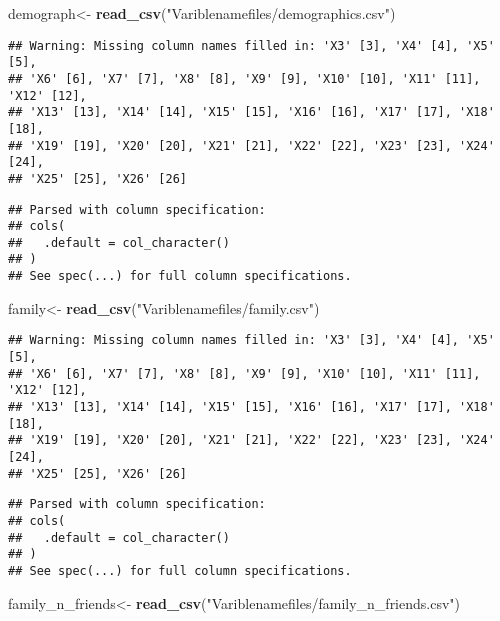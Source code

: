 \documentclass[]{article}
\newenvironment{Shaded}{\begin{snugshade}}{\end{snugshade}}
\newcommand{\KeywordTok}[1]{\textcolor[rgb]{0.13,0.29,0.53}{\textbf{#1}}}
\newcommand{\StringTok}[1]{\textcolor[rgb]{0.31,0.60,0.02}{#1}}
\newcommand{\NormalTok}[1]{#1}
\begin{document}
\begin{Shaded}
\begin{Highlighting}[]
\NormalTok{demograph<-}\StringTok{ }\KeywordTok{read_csv}\NormalTok{(}\StringTok{"Variblenamefiles/demographics.csv"}\NormalTok{)}
\end{Highlighting}
\end{Shaded}

\begin{verbatim}
## Warning: Missing column names filled in: 'X3' [3], 'X4' [4], 'X5' [5],
## 'X6' [6], 'X7' [7], 'X8' [8], 'X9' [9], 'X10' [10], 'X11' [11], 'X12' [12],
## 'X13' [13], 'X14' [14], 'X15' [15], 'X16' [16], 'X17' [17], 'X18' [18],
## 'X19' [19], 'X20' [20], 'X21' [21], 'X22' [22], 'X23' [23], 'X24' [24],
## 'X25' [25], 'X26' [26]
\end{verbatim}

\begin{verbatim}
## Parsed with column specification:
## cols(
##   .default = col_character()
## )
## See spec(...) for full column specifications.
\end{verbatim}

\begin{Shaded}
\begin{Highlighting}[]
\NormalTok{family<-}\StringTok{ }\KeywordTok{read_csv}\NormalTok{(}\StringTok{"Variblenamefiles/family.csv"}\NormalTok{)}
\end{Highlighting}
\end{Shaded}

\begin{verbatim}
## Warning: Missing column names filled in: 'X3' [3], 'X4' [4], 'X5' [5],
## 'X6' [6], 'X7' [7], 'X8' [8], 'X9' [9], 'X10' [10], 'X11' [11], 'X12' [12],
## 'X13' [13], 'X14' [14], 'X15' [15], 'X16' [16], 'X17' [17], 'X18' [18],
## 'X19' [19], 'X20' [20], 'X21' [21], 'X22' [22], 'X23' [23], 'X24' [24],
## 'X25' [25], 'X26' [26]
\end{verbatim}

\begin{verbatim}
## Parsed with column specification:
## cols(
##   .default = col_character()
## )
## See spec(...) for full column specifications.
\end{verbatim}

\begin{Shaded}
\begin{Highlighting}[]
\NormalTok{family_n_friends<-}\StringTok{ }\KeywordTok{read_csv}\NormalTok{(}\StringTok{"Variblenamefiles/family_n_friends.csv"}\NormalTok{)}
\end{Highlighting}
\end{Shaded}
\end{document}
